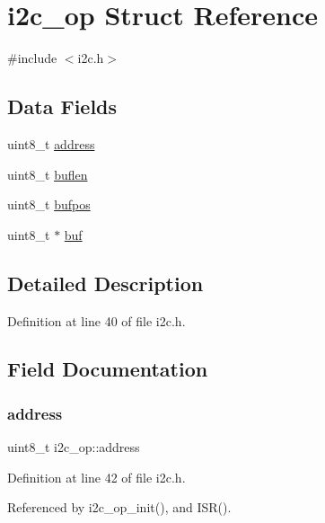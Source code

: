 \hypertarget{structi2c__op}{}\section{i2c\+\_\+op Struct Reference}
\label{structi2c__op}


{\ttfamily \#include $<$i2c.\+h$>$}

\subsection*{Data Fields}
\begin{DoxyCompactItemize}
\item 
uint8\+\_\+t \hyperlink{structi2c__op_ad26962ee9e46e40e9ab7d45419e28c18}{address}
\item 
uint8\+\_\+t \hyperlink{structi2c__op_afd970c99924335052fcc298abda4bfd5}{buflen}
\item 
uint8\+\_\+t \hyperlink{structi2c__op_a5d137a5400fc18224e7761017f0300fa}{bufpos}
\item 
uint8\+\_\+t $\ast$ \hyperlink{structi2c__op_ad988da068bf828e0f7ccfea5e9a5b83f}{buf}
\end{DoxyCompactItemize}


\subsection{Detailed Description}


Definition at line 40 of file i2c.\+h.



\subsection{Field Documentation}
\mbox{\label{structi2c__op_ad26962ee9e46e40e9ab7d45419e28c18}} 
\subsubsection{\texorpdfstring{address}{address}}
{\footnotesize\ttfamily uint8\+\_\+t i2c\+\_\+op\+::address}



Definition at line 42 of file i2c.\+h.



Referenced by i2c\+\_\+op\+\_\+init(), and I\+S\+R().

